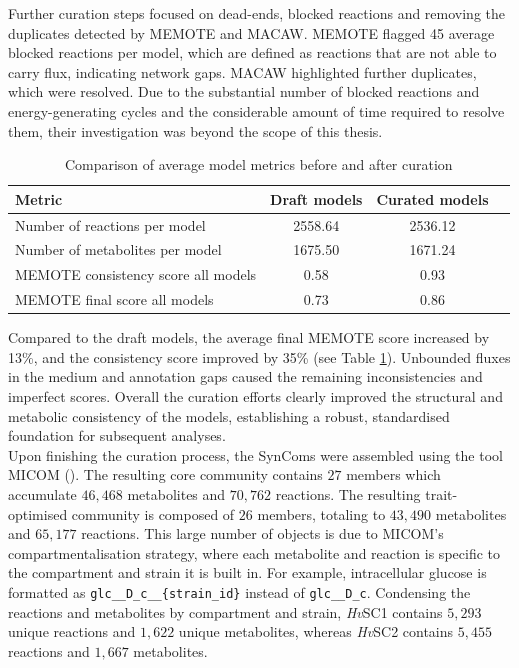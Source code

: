 Further curation steps focused on dead-ends, blocked reactions and removing the duplicates detected by MEMOTE and MACAW. MEMOTE flagged 45 average blocked reactions per model, which are defined as reactions that are not able to carry flux, indicating network gaps. MACAW highlighted further duplicates, which were resolved. Due to the substantial number of blocked reactions and energy-generating cycles and the considerable amount of time required to resolve them, their investigation was beyond the scope of this thesis.

\begin{table}[H]
  \centering
  \caption{Comparison of average model metrics before and after curation}
  \label{tab:average_model_metrics}
  \begin{tabularx}{\linewidth}{Xccc}
    \hline
    \textbf{Metric} & \textbf{Draft models} & \textbf{Curated models} \\ \hline
    Number of reactions per model & 2558.64 & 2536.12 \\
    Number of metabolites per model & 1675.50 & 1671.24 \\
    MEMOTE consistency score all models & 0.58 & 0.93 \\
    MEMOTE final score all models & 0.73 & 0.86 \\ \hline
  \end{tabularx}
\end{table}

Compared to the draft models, the average final MEMOTE score increased by 13\%, and the consistency score improved by 35\% (see Table \ref{tab:average_model_metrics}). Unbounded fluxes in the medium and annotation gaps caused the remaining inconsistencies and imperfect scores. Overall the curation efforts clearly improved the structural and metabolic consistency of the models, establishing a robust, standardised foundation for subsequent analyses.
\\


Upon finishing the curation process, the SynComs were assembled using the tool MICOM (\cite{diener_micom_2020}). The resulting core community contains $27$ members which accumulate $46{,}468$ metabolites and $70{,}762$ reactions. The resulting trait-optimised community is composed of $26$ members, totaling to $43{,}490$ metabolites and $65{,}177$ reactions. This large number of objects is due to MICOM's compartmentalisation strategy, where each metabolite and reaction is specific to the compartment and strain it is built in. For example, intracellular glucose is formatted as \texttt{glc\_\_D\_c\_\_\{strain\_id\}} instead of \texttt{glc\_\_D\_c}. Condensing the reactions and metabolites by compartment and strain, \textit{Hv}SC1 contains $5{,}293$ unique reactions and $1{,}622$ unique metabolites, whereas \textit{Hv}SC2 contains $5{,}455$ reactions and $1{,}667$ metabolites.



